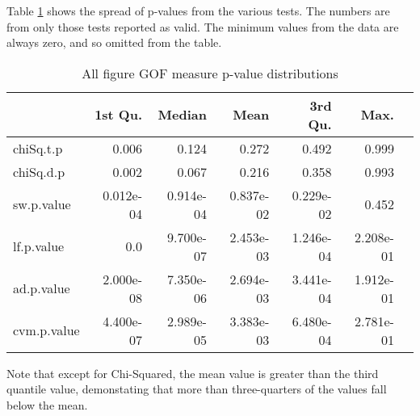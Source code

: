 Table \ref{table:alldist} shows the spread of p-values from the various tests.
The numbers are from only those tests reported as valid.
The minimum values from the data are always zero, and so omitted from the table.

\begin{table}[h!]
\centering
\begin{tabular}{l | r r r r r r}
& 1st Qu. & Median &  Mean & 3rd Qu. &  Max. \\
 \hline
chiSq.t.p & 0.006 & 0.124 & 0.272 & 0.492 & 0.999 \\
chiSq.d.p & 0.002 & 0.067 & 0.216 & 0.358 & 0.993 \\
sw.p.value & 0.012e-04 & 0.914e-04 & 0.837e-02 & 0.229e-02 & 0.452 \\
lf.p.value & 0.0 & 9.700e-07 & 2.453e-03 & 1.246e-04 & 2.208e-01 \\
ad.p.value & 2.000e-08 & 7.350e-06 & 2.694e-03 & 3.441e-04 & 1.912e-01 \\
cvm.p.value & 4.400e-07 & 2.989e-05 & 3.383e-03 & 6.480e-04 & 2.781e-01 \\
\end{tabular}
\caption{All figure GOF measure p-value distributions}
\label{table:alldist}
\end{table}

Note that except for Chi-Squared, the mean value is greater than the
third quantile value,
demonstating that more than three-quarters of the values fall below the mean.

\begin{figure}
  \centering
  
\end{figure}

